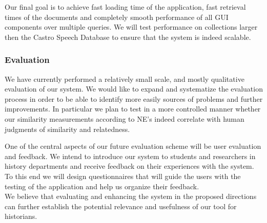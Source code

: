 Our final goal is to achieve fast loading time of the application, fast retrieval times of the documents and completely 
smooth performance of all GUI components over multiple queries. We will test performance on collections larger then the Castro Speech Database to ensure
that the system is indeed scalable.    

\subsubsection{Evaluation}

We have currently performed a relatively small scale, and mostly qualitative evaluation of our system. We would like to 
expand and systematize the evaluation process in order to be able to identify more easily sources of problems and further improvements.
In particular we plan to test in a more controlled manner whether our similarity measurements according to NE's indeed correlate with human judgments of similarity and relatedness.   

One of the central aspects of our future evaluation scheme will be user evaluation and feedback. We intend to introduce our system
to students and researchers in history departments and receive feedback on their experiences with the system.
To this end we will design questionnaires that will guide the users with the testing of the application and help us organize their feedback.\\
 
We believe that evaluating and enhancing the system in the proposed directions can further establish the potential relevance and usefulness 
of our tool for historians.  

